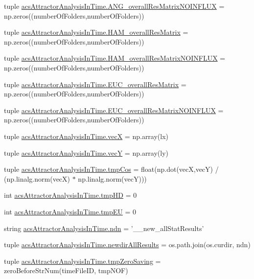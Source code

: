 \begin{DoxyCompactItemize}
\item 
tuple \hyperlink{a00097_a7b0e67be0cf8de69432bdf56919d9e33}{acs\-Attractor\-Analysis\-In\-Time.\-A\-N\-G\-\_\-overall\-Res\-Matrix\-N\-O\-I\-N\-F\-L\-U\-X} = np.\-zeros((number\-Of\-Folders,number\-Of\-Folders))
\item 
tuple \hyperlink{a00097_a5e8d5d65865736555e76c3f04058ddd9}{acs\-Attractor\-Analysis\-In\-Time.\-H\-A\-M\-\_\-overall\-Res\-Matrix} = np.\-zeros((number\-Of\-Folders,number\-Of\-Folders))
\item 
tuple \hyperlink{a00097_a6ea74abf4c94200ed1b27d892ecacc97}{acs\-Attractor\-Analysis\-In\-Time.\-H\-A\-M\-\_\-overall\-Res\-Matrix\-N\-O\-I\-N\-F\-L\-U\-X} = np.\-zeros((number\-Of\-Folders,number\-Of\-Folders))
\item 
tuple \hyperlink{a00097_a63ee1925f76a40d04495e9b35c0973d2}{acs\-Attractor\-Analysis\-In\-Time.\-E\-U\-C\-\_\-overall\-Res\-Matrix} = np.\-zeros((number\-Of\-Folders,number\-Of\-Folders))
\item 
tuple \hyperlink{a00097_a4f2ecc559d2c5d79bb138a2e8ced8127}{acs\-Attractor\-Analysis\-In\-Time.\-E\-U\-C\-\_\-overall\-Res\-Matrix\-N\-O\-I\-N\-F\-L\-U\-X} = np.\-zeros((number\-Of\-Folders,number\-Of\-Folders))
\item 
tuple \hyperlink{a00097_a55e7171c96f320a08ad29f21ad5faf9a}{acs\-Attractor\-Analysis\-In\-Time.\-vec\-X} = np.\-array(lx)
\item 
tuple \hyperlink{a00097_aaa4ad55a8fe44bfc5a386dff027886b0}{acs\-Attractor\-Analysis\-In\-Time.\-vec\-Y} = np.\-array(ly)
\item 
tuple \hyperlink{a00097_a547703ec10e432928645bbe8d226dceb}{acs\-Attractor\-Analysis\-In\-Time.\-tmp\-Cos} = float(np.\-dot(vec\-X,vec\-Y) / (np.\-linalg.\-norm(vec\-X) $\ast$ np.\-linalg.\-norm(vec\-Y)))
\item 
int \hyperlink{a00097_a35b7af9eb7cd962d33c5d56eae794c7b}{acs\-Attractor\-Analysis\-In\-Time.\-tmp\-H\-D} = 0
\item 
int \hyperlink{a00097_a9019a56cfd992899ffc519204307a8ae}{acs\-Attractor\-Analysis\-In\-Time.\-tmp\-E\-U} = 0
\item 
string \hyperlink{a00097_ab0e0a55161ee1fd9fb0f086a328f67b7}{acs\-Attractor\-Analysis\-In\-Time.\-ndn} = '\-\_\-\_\-new\-\_\-all\-Stat\-Results'
\item 
tuple \hyperlink{a00097_aaf0f6fcbaaf97dcff16b62e86df0209c}{acs\-Attractor\-Analysis\-In\-Time.\-newdir\-All\-Results} = os.\-path.\-join(os.\-curdir, ndn)
\item 
tuple \hyperlink{a00097_ae86fc9dc3283934244ec28446445f722}{acs\-Attractor\-Analysis\-In\-Time.\-tmp\-Zero\-Saving} = zero\-Before\-Str\-Num(time\-File\-I\-D, tmp\-N\-O\-F)

\end{DoxyCompactItemize}
